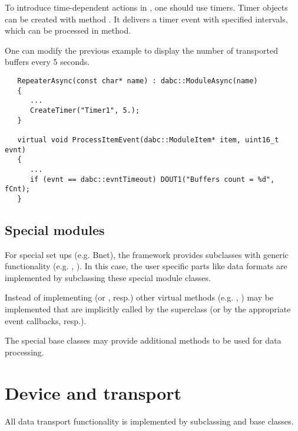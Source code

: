 To introduce time-dependent actions in , 
one should use timers. Timer objects can be created with method 
. It delivers a timer event with specified intervals, 
which can be processed in  method.

One can modify the previous example to display the number of transported buffers
every 5 seconds.

\begin{small}
\begin{verbatim}
   RepeaterAsync(const char* name) : dabc::ModuleAsync(name)
   {
      ...
      CreateTimer("Timer1", 5.);
   }

   virtual void ProcessItemEvent(dabc::ModuleItem* item, uint16_t evnt)
   {
      ...
      if (evnt == dabc::evntTimeout) DOUT1("Buffers count = %d", fCnt);  
   }
\end{verbatim}
\end{small}
   

\subsection{Special modules}
For special set ups (e.g. Bnet), the framework provides 
    subclasses with generic functionality 
   (e.g. , ). 
   In this case, the user specific parts like data formats are 
   implemented by subclassing these special module classes.

   
\begin{compactenum}

\item  Instead of implementing  (or , resp.) 
other virtual methods (e.g. , ) may be 
      implemented that are implicitly called by the superclass  (or
      by the appropriate event callbacks, resp.).
\item  The special base classes may provide additional 
      methods to be used for data processing.    
\end{compactenum}

\section{Device and transport}
\label{prog_plugin_device}
All data transport functionality is implemented by 
   subclassing   and  base classes.


